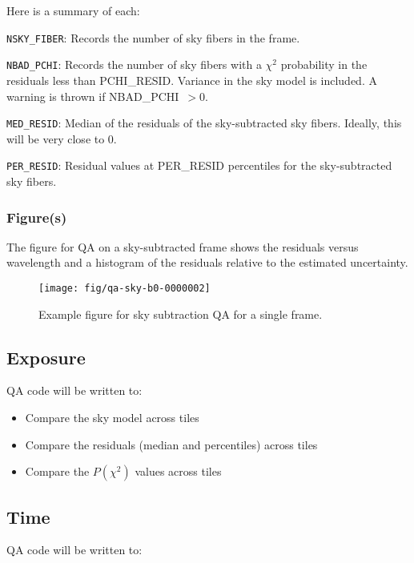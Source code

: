 \documentclass[12pt]{article}
\newenvironment{myitemize}
{ \begin{itemize}
    \setlength{\itemsep}{0pt}
    \setlength{\parskip}{0pt}
    \setlength{\parsep}{0pt}     }
{ \end{itemize}                  }
\begin{document}
\noindent
Here is a summary of each:

\vskip 0.2in

\noindent
{\tt NSKY\_FIBER}:  Records the number of sky fibers in the frame.

\noindent
{\tt NBAD\_PCHI}:  Records the number of sky fibers with a 
$\chi^2$ probability in the residuals less than PCHI\_RESID.  
Variance in the sky model is included.
A warning is thrown if NBAD\_PCHI~$>0$.

\noindent
{\tt MED\_RESID}:  Median of the residuals of the sky-subtracted
sky fibers.  Ideally, this will be very close to 0.

\noindent
{\tt PER\_RESID}:  Residual values at PER\_RESID percentiles for
 the sky-subtracted sky fibers.  

\subsubsection{Figure(s)}

The figure for QA on a sky-subtracted frame shows the
residuals versus wavelength and a histogram of 
the residuals relative to the estimated uncertainty. 

\begin{figure}[htb]
\begin{center}
\texttt{[image: fig/qa-sky-b0-0000002]}
\caption{Example figure for sky subtraction QA
for a single frame.  
}
\label{fig:skysub_frame}
\end{center}
\end{figure}


\subsection{Exposure}

QA code will be written to:

\begin{myitemize}
\item Compare the sky model across tiles 
\item Compare the residuals (median and percentiles) across tiles
\item Compare the $P(\chi^2)$ values across tiles
\end{myitemize}

\subsection{Time}

QA code will be written to:
\end{document}
